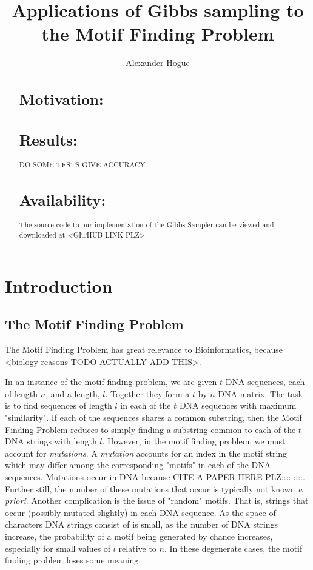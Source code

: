 \documentclass{bioinfo}
\begin{document}
\title[short Title]{Applications of Gibbs sampling to the Motif Finding Problem}
\author[Sample \textit{et~al}]{Alexander Hogue}
\address{}
\history{}
\editor{}

\maketitle

\begin{abstract}

\section{Motivation:}

\section{Results:}
DO SOME TESTS
GIVE ACCURACY

\section{Availability:}
The source code to our implementation of the Gibbs Sampler can be viewed and downloaded at <GITHUB LINK PLZ>

\end{abstract}

\section{Introduction}
\subsection{The Motif Finding Problem}
The Motif Finding Problem has great relevance to Bioinformatics, because <biology reasons TODO ACTUALLY ADD THIS>. 

In an instance of the motif finding problem, we are given $t$ DNA sequences, each of length $n$, and a length, $l$. Together they form a $t$ by $n$ DNA matrix.
The task is to find sequences of length $l$ in each of the $t$ DNA sequences with maximum "similarity". If each of the sequences shares a common substring, then the Motif Finding Problem reduces to simply finding a substring common to each of the $t$ DNA strings with length $l$. However, in the motif finding problem, we must account for \textit{mutations}. A \textit{mutation} accounts for an index in the motif string which may differ among the corresponding "motifs" in each of the DNA sequences. Mutations occur in DNA because CITE A PAPER HERE PLZ:::::::::. Further still, the number of these mutations that occur is typically not known \textit{a priori}. Another complication is the issue of "random" motifs. That is, strings that occur (possibly mutated slightly) in each DNA sequence. As the space of characters DNA strings consist of is small, as the number of DNA strings increase, the probability of a motif being generated by chance increases, especially for small values of $l$ relative to $n$. In these degenerate cases, the motif finding problem loses some meaning.
\end{document}
